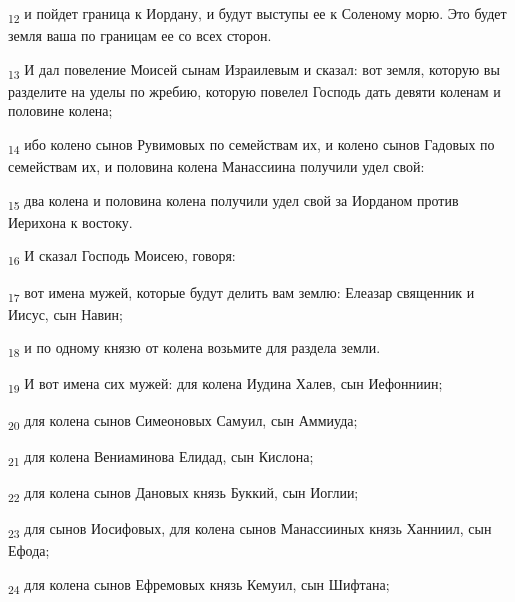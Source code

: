 \begin{tcolorbox}
\textsubscript{12} и пойдет граница к Иордану, и будут выступы ее к Соленому морю. Это будет земля ваша по границам ее со всех сторон.
\end{tcolorbox}
\begin{tcolorbox}
\textsubscript{13} И дал повеление Моисей сынам Израилевым и сказал: вот земля, которую вы разделите на уделы по жребию, которую повелел Господь дать девяти коленам и половине колена;
\end{tcolorbox}
\begin{tcolorbox}
\textsubscript{14} ибо колено сынов Рувимовых по семействам их, и колено сынов Гадовых по семействам их, и половина колена Манассиина получили удел свой:
\end{tcolorbox}
\begin{tcolorbox}
\textsubscript{15} два колена и половина колена получили удел свой за Иорданом против Иерихона к востоку.
\end{tcolorbox}
\begin{tcolorbox}
\textsubscript{16} И сказал Господь Моисею, говоря:
\end{tcolorbox}
\begin{tcolorbox}
\textsubscript{17} вот имена мужей, которые будут делить вам землю: Елеазар священник и Иисус, сын Навин;
\end{tcolorbox}
\begin{tcolorbox}
\textsubscript{18} и по одному князю от колена возьмите для раздела земли.
\end{tcolorbox}
\begin{tcolorbox}
\textsubscript{19} И вот имена сих мужей: для колена Иудина Халев, сын Иефонниин;
\end{tcolorbox}
\begin{tcolorbox}
\textsubscript{20} для колена сынов Симеоновых Самуил, сын Аммиуда;
\end{tcolorbox}
\begin{tcolorbox}
\textsubscript{21} для колена Вениаминова Елидад, сын Кислона;
\end{tcolorbox}
\begin{tcolorbox}
\textsubscript{22} для колена сынов Дановых князь Буккий, сын Иоглии;
\end{tcolorbox}
\begin{tcolorbox}
\textsubscript{23} для сынов Иосифовых, для колена сынов Манассииных князь Ханниил, сын Ефода;
\end{tcolorbox}
\begin{tcolorbox}
\textsubscript{24} для колена сынов Ефремовых князь Кемуил, сын Шифтана;
\end{tcolorbox}
